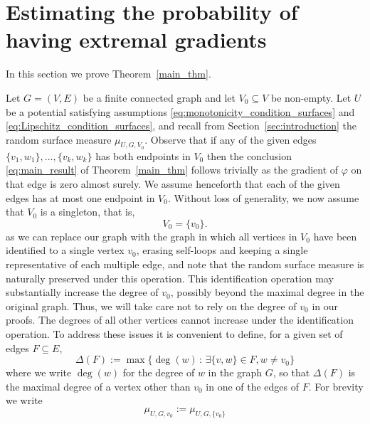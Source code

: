 \documentclass[english]{article}
\theoremstyle{plain}
\theoremstyle{plain}
\begin{document}
\section{Estimating the probability of having extremal gradients}\label{extremal_gradients_sec}
In this section we prove Theorem~\ref{main_thm}.

Let $G=\left(V,E\right)$ be a finite connected graph and let
$V_0\subseteq V$ be non-empty.  Let $U$ be a potential satisfying assumptions
\eqref{eq:monotonicity_condition_surfaces} and \eqref{eq:Lipschitz_condition_surfaces}, and recall from
Section~\ref{sec:introduction} the random surface measure $\mu_{U,G,V_0}$. Observe that if any of the given edges $\{v_1,w_1\},\ldots,\{v_k, w_k\}$ has both endpoints in $V_0$ then the conclusion \eqref{eq:main_result} of Theorem~\ref{main_thm} follows trivially as the gradient of $\varphi$ on that edge is zero almost surely. We assume henceforth that each of the given edges has at most one endpoint in $V_0$. Without loss of generality, we now assume that $V_0$ is a singleton, that is,
\[
 V_0=\{v_0\}.
\]
as we can replace our graph with the graph in which all vertices in $V_0$ have been identified to a single vertex $v_0$, erasing self-loops and keeping a single representative of each multiple edge, and note that the random surface measure is naturally preserved under this operation. This identification operation may substantially increase the degree of $v_0$, possibly beyond the maximal degree in the original graph. Thus, we will take care not to rely on the degree of $v_0$ in our proofs. The degrees of all other vertices cannot increase under the identification operation. To address these issues it is convenient to define, for a given set of edges $F\subseteq E$,
\begin{equation*}
  \Delta(F) := \max\{\deg(w)\,:\, \exists \{v,w\}\in F, w\neq v_0\}
\end{equation*}
where we write $\deg(w)$ for the degree of $w$ in the graph $G$, so that $\Delta(F)$ is the maximal degree of a vertex other than $v_0$ in one of the edges of $F$. For brevity we write
\[
\mu_{U,G,v_0}:=\mu_{U,G,\{v_0\}}
\]
\end{document}

